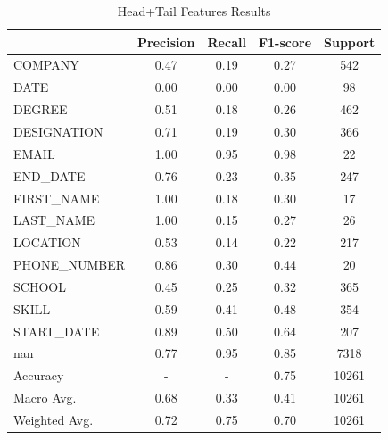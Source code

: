   \clearpage
  \begin{table}[t]
    \centering
    \begin{tabular}{|l|c|c|c|c|}
         \hline
             & Precision & Recall & F1-score & Support \\
         \hline
     COMPANY & 0.47 & 0.19 & 0.27 &   542 \\
        DATE & 0.00 & 0.00 & 0.00 &    98 \\
      DEGREE & 0.51 & 0.18 & 0.26 &   462 \\
 DESIGNATION & 0.71 & 0.19 & 0.30 &   366 \\
       EMAIL & 1.00 & 0.95 & 0.98 &    22 \\
    END\_DATE & 0.76 & 0.23 & 0.35 &   247 \\
  FIRST\_NAME & 1.00 & 0.18 & 0.30 &    17 \\
   LAST\_NAME & 1.00 & 0.15 & 0.27 &    26 \\
    LOCATION & 0.53 & 0.14 & 0.22 &   217 \\
PHONE\_NUMBER & 0.86 & 0.30 & 0.44 &    20 \\
      SCHOOL & 0.45 & 0.25 & 0.32 &   365 \\
       SKILL & 0.59 & 0.41 & 0.48 &   354 \\
  START\_DATE & 0.89 & 0.50 & 0.64 &   207 \\
         nan & 0.77 & 0.95 & 0.85 &  7318 \\

         \hline
    Accuracy &  -  &  -  & 0.75 & 10261 \\
   Macro Avg. & 0.68 & 0.33 & 0.41 & 10261 \\
Weighted Avg. & 0.72 & 0.75 & 0.70 & 10261 \\
         \hline
    \end{tabular}
    \caption{Head+Tail Features Results}
    \label{table:5}
  \end{table}

